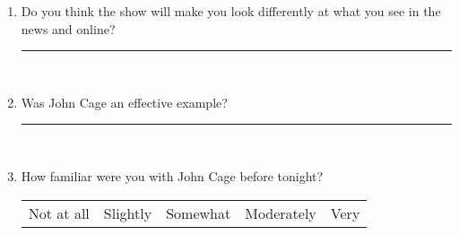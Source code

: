 \documentclass[12pt]{extarticle}
\begin{document}
\begin{enumerate}
  \item Do you think the show will make you look differently at what you see in the news and online?

  \vspace{0.5cm}
  \rule{6in}{1pt}\\

  \item Was John Cage an effective example?

  \vspace{0.5cm}
  \rule{6in}{1pt}\\

  \item How familiar were you with John Cage before tonight?

  \begin{tabular}{l|l|l|l|l}
    Not at all & Slightly & Somewhat & Moderately & Very
  \end{tabular}

\end{enumerate}
\end{document}
